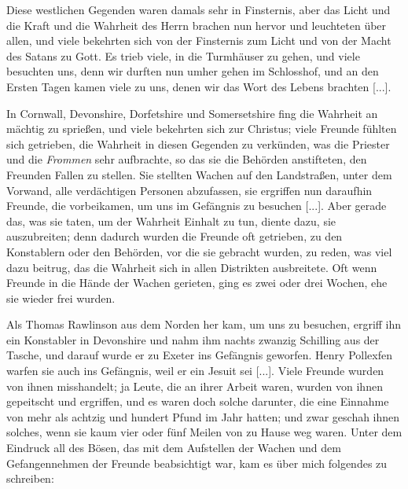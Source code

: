 Diese westlichen Gegenden waren damals sehr in Finsternis, aber
das Licht und die Kraft und die Wahrheit des Herrn brachen
nun hervor und leuchteten über allen, und viele bekehrten sich
von der Finsternis zum Licht und von der Macht 
des Satans
zu Gott. Es trieb viele, in die Turmhäuser zu gehen, und viele
besuchten uns, denn wir durften nun umher gehen im Schlosshof,
und an den Ersten Tagen kamen viele zu uns, denen wir das
Wort des Lebens brachten [...].

In Cornwall, Devonshire, Dorfetshire und Somersetshire
fing die Wahrheit an mächtig zu sprießen, und viele bekehrten sich
zur Christus; viele Freunde fühlten sich getrieben, die Wahrheit
in diesen Gegenden zu verkünden, was die Priester und die
\textit{Frommen} sehr aufbrachte, so das sie die Behörden anstifteten,
den Freunden Fallen zu stellen. Sie stellten Wachen auf den
Landstraßen, unter dem Vorwand, alle verdächtigen Personen
abzufassen, sie ergriffen nun daraufhin Freunde, die vorbeikamen,
um uns im Gefängnis zu besuchen [...]. Aber gerade das,
was sie taten, um der Wahrheit Einhalt zu tun, diente dazu, sie
auszubreiten; denn dadurch wurden die Freunde oft getrieben, zu
den Konstablern oder den Behörden, vor die sie gebracht wurden,
zu reden, was viel dazu beitrug, das die Wahrheit sich in allen
Distrikten ausbreitete. Oft wenn Freunde in die Hände der
Wachen gerieten, ging es zwei oder drei Wochen, ehe sie wieder
frei wurden.


Als Thomas Rawlinson aus dem 
Norden her kam, um uns
zu besuchen, ergriff ihn ein Konstabler in Devonshire und nahm
ihm nachts zwanzig Schilling aus der Tasche, und darauf wurde
er zu Exeter ins Gefängnis geworfen. 
Henry Pollexfen warfen
sie auch ins Gefängnis, weil er ein Jesuit sei [...]. Viele
Freunde wurden von ihnen misshandelt; ja Leute, die an ihrer
Arbeit waren, wurden von ihnen gepeitscht und ergriffen, und
es waren doch solche darunter, die eine Einnahme von mehr
als achtzig und hundert Pfund im Jahr hatten; und zwar
geschah ihnen solches, wenn sie kaum vier oder fünf Meilen von
zu Hause weg waren. Unter dem Eindruck all des Bösen, das
mit dem Aufstellen der Wachen und dem Gefangennehmen der
Freunde beabsichtigt war, kam es über mich folgendes zu schreiben:

